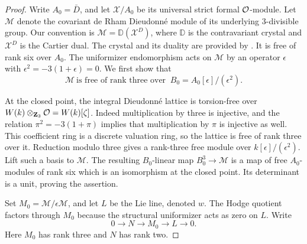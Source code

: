 \begin{proof}
Write \(A_0=\bar D\), and let \(\mathcal X/A_0\) be its universal
strict formal \(\mathcal O\)-module.
Let \(\mathcal M\) denote the covariant de Rham Dieudonn\'e module
of its underlying \(3\)-divisible group.  Our convention is
\(\mathcal M=\mathbb D(\mathcal X^D)\), where \(\mathbb D\) is the
contravariant crystal and \(\mathcal X^D\) is the Cartier dual.
The crystal and its duality are provided by
\cite[Section~2.2, Theorem~2, and Section~5.2, Theorem~5(i)]{BerthelotMessing}.
It is free of rank six
over \(A_0\).  The uniformizer endomorphism acts on \(\mathcal M\)
by an operator \(\epsilon\) with
\(\epsilon^2=-3(1+\epsilon)=0\).
We first show that
\[
 \mathcal M\ \text{is free of rank three over }\
 B_0=A_0[\epsilon]/(\epsilon^2).
\]

At the closed point, the integral Dieudonn\'e lattice is
torsion-free over \(W(k)\otimes_{\mathbf Z_3}\mathcal O=W(k)[\zeta]\).
Indeed multiplication by three is injective, and the relation
\(\pi^2=-3(1+\pi)\) implies that multiplication by \(\pi\) is
injective as well.  This coefficient ring is a discrete valuation
ring, so the lattice is free of rank three over it.
Reduction modulo three gives a rank-three free module over
\(k[\epsilon]/(\epsilon^2)\).
Lift such a basis to \(\mathcal M\).  The resulting
\(B_0\)-linear map \(B_0^3\to\mathcal M\) is a map of free
\(A_0\)-modules of rank six which is an isomorphism at the closed
point.  Its determinant is a unit, proving the assertion.

Set \(M_0=\mathcal M/\epsilon\mathcal M\), and let \(L\) be the Lie
line, denoted \(w\).  The Hodge quotient factors through \(M_0\)
because the structural uniformizer acts as zero on \(L\).
Write
\begin{equation}\label{coef:hodge-quotient}
 0\longrightarrow N\longrightarrow M_0\longrightarrow L
       \longrightarrow0.
\end{equation}
Here \(M_0\) has rank three and \(N\) has rank two.


\end{proof}
